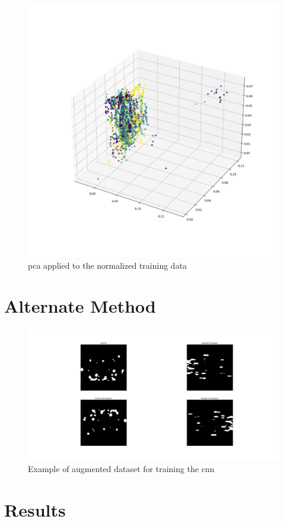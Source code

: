 \documentclass[10pt,twocolumn,letterpaper]{article}
\begin{document}
\begin{figure}[h]
  \centering
   \includegraphics[width=0.9\linewidth]{pca}
   \caption{\acrlong{pca} applied to the normalized training data}
   \label{fig:pca}
\end{figure}

\section{Alternate Method}
\label{sec:alt_method}

\begin{figure}[h]
  \centering
   \includegraphics[width=.9\linewidth]{cnn_augmented_images}
   \caption{Example of augmented dataset for training the \acrlong{cnn}}
   \label{fig:cnn_aug_imgs}
\end{figure}

\section{Results}
\label{sec:results}
\end{document}
